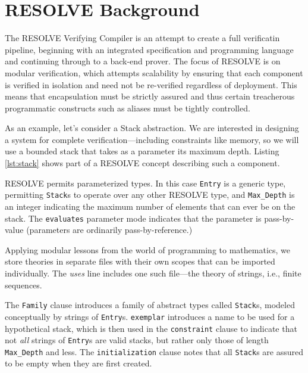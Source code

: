 \chapter{RESOLVE Background}\label{sec:resolveBackground}
The RESOLVE\cite{RESOLVE} Verifying Compiler is an attempt to create a full verificatin pipeline, beginning with an integrated specification and programming language and continuing through to a back-end prover.  The focus of RESOLVE is on modular verification, which attempts scalability by ensuring that each component is verified in isolation and need not be re-verified regardless of deployment.  This means that encapsulation must be strictly assured and thus certain treacherous programmatic constructs such as aliases must be tightly controlled.

As an example, let's consider a Stack abstraction.  We are interested in designing a system for complete verification---including constraints like memory, so we will use a bounded stack that takes as a parameter its maximum depth.  Listing \ref{lst:stack} shows part of a RESOLVE concept describing such a component.



RESOLVE permits parameterized types.  In this case \texttt{Entry} is a generic type, permitting \texttt{Stack}s to operate over any other RESOLVE type, and \texttt{Max\_Depth} is an integer indicating the maximum number of elements that can ever be on the stack.  The \texttt{evaluates} parameter mode indicates that the parameter is pass-by-value (parameters are ordinarily pass-by-reference.)

Applying modular lessons from the world of programming to mathematics, we store theories in separate files with their own scopes that can be imported individually\cite{smith08}.  The \emph{uses} line includes one such file---the theory of strings, i.e., finite sequences.

The \texttt{Family} clause introduces a family of abstract types called \texttt{Stack}s, modeled conceptually by strings of \texttt{Entry}s.  \texttt{exemplar} introduces a name to be used for a hypothetical stack, which is then used in the \texttt{constraint} clause to indicate that not \emph{all} strings of \texttt{Entry}s are valid stacks, but rather only those of length \texttt{Max\_Depth} and less.  The \texttt{initialization} clause notes that all \texttt{Stack}s are assured to be empty when they are first created.

